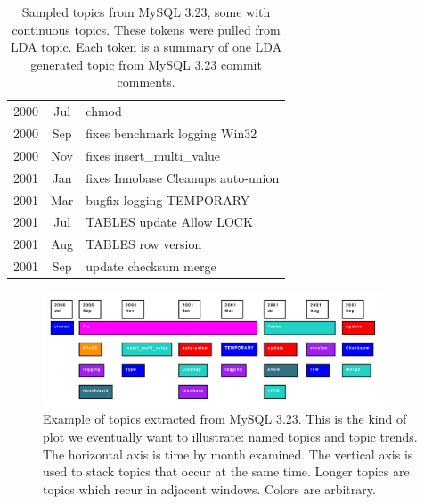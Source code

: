 \documentclass[times, 10pt,twocolumn]{article}
\begin{document}
\begin{table}
\centering
\begin{tabular}{|cc|l|}
\hline
2000 &  Jul &      chmod \\
2000 &  Sep &      fixes benchmark logging Win32 \\
2000 &  Nov &      fixes insert\_multi\_value \\
2001 &  Jan &      fixes Innobase Cleanups auto-union \\
2001 &  Mar &      bugfix logging  TEMPORARY  \\
\hline         
2001 &  Jul &      TABLES update Allow LOCK \\ 
               
2001 &  Aug &      TABLES row version \\
\hline         
2001 &  Sep &      update checksum merge \\
\hline
\end{tabular}
\caption{Sampled topics from MySQL 3.23, some with continuous topics. These tokens were pulled from LDA topic. Each token is a summary of one LDA generated topic from MySQL 3.23 commit comments.}
\label{tab:portability}
\end{table}



\begin{figure}[t]
  \centering
  \includegraphics[width=0.9\textwidth]{lda}
  \caption{Example of topics extracted from MySQL 3.23. This is the
    kind of plot we eventually want to illustrate: named topics and
    topic trends. The horizontal axis is time by month examined. The
    vertical axis is used to stack topics that occur at the same
    time. Longer topics are topics which recur in adjacent
    windows. Colors are arbitrary.}
  \label{fig:lda}
\end{figure}
\end{document}
